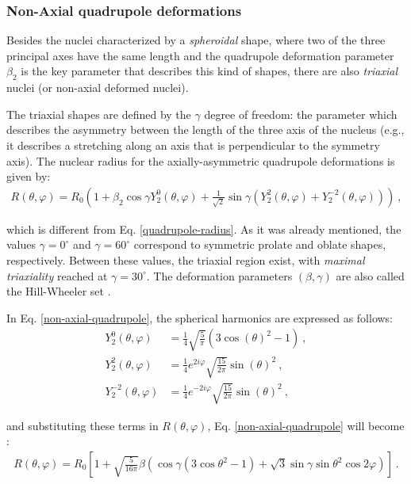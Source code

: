 \subsubsection{Non-Axial quadrupole deformations}

Besides the nuclei characterized by a \emph{spheroidal} shape, where two of the three principal axes have the same length and the quadrupole deformation parameter $\beta_2$ is the key parameter that describes this kind of shapes, there are also \emph{triaxial} nuclei (or non-axial deformed nuclei).

The triaxial shapes are defined by the $\gamma$ degree of freedom: the parameter which describes the asymmetry between the length of the three axis of the nucleus (e.g., it describes a stretching along an axis that is perpendicular to the symmetry axis). The nuclear radius for the axially-asymmetric quadrupole deformations is given by:
\begin{align}
    R(\theta,\varphi)=R_0\left(1+\beta_2\cos\gamma Y_2^0(\theta,\varphi)+\frac{1}{\sqrt{2}}\sin\gamma(Y_2^2(\theta,\varphi)+Y_2^{-2}(\theta,\varphi))\right)\ ,
    \label{non-axial-quadrupole}
\end{align}

which is different from Eq. \ref{quadrupole-radius}. As it was already mentioned, the values $\gamma=0^\circ$ and $\gamma=60^\circ$ correspond to symmetric prolate and oblate shapes, respectively. Between these values, the triaxial region exist, with \emph{maximal triaxiality} reached at $\gamma=30^\circ$. The deformation parameters $(\beta,\gamma)$ are also called the Hill-Wheeler set \cite{wong2008introductory}.

In Eq. \ref{non-axial-quadrupole}, the spherical harmonics are expressed as follows:
\begin{align}
    Y_2^0(\theta,\varphi)&=\frac{1}{4}\sqrt{\frac{5}{\pi}}\left(3\cos(\theta)^2-1\right)\ , \nonumber\\
    Y_2^2(\theta,\varphi)&=\frac{1}{4}e^{2i\varphi}\sqrt{\frac{15}{2\pi}}\sin(\theta)^2\ ,\nonumber\\
    Y_2^{-2}(\theta,\varphi)&=\frac{1}{4}e^{-2i\varphi}\sqrt{\frac{15}{2\pi}}\sin(\theta)^2\ ,
\end{align}

and substituting these terms in $R(\theta,\varphi)$, Eq. \ref{non-axial-quadrupole} will become \cite{andersson1976nuclear,bohr1998nuclear}:
\begin{align}
    R(\theta,\varphi)=R_0\left[1+\sqrt{\frac{5}{16\pi}}\beta\left(\cos\gamma(3\cos\theta^2-1)+\sqrt{3}\sin\gamma\sin\theta^2\cos2\varphi\right)\right]\ .
\end{align}

